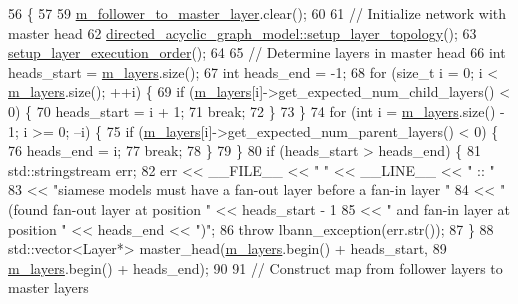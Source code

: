 \begin{DoxyCode}
56                                          \{
57 
59   \hyperlink{classlbann_1_1siamese__model_aae7af40b4a2db59082cd4c9149a1affd}{m\_follower\_to\_master\_layer}.clear();
60 
61   \textcolor{comment}{// Initialize network with master head}
62   \hyperlink{classlbann_1_1model_a7b3e2a643c658dcaa7478d2568f29784}{directed\_acyclic\_graph\_model::setup\_layer\_topology}();
63   \hyperlink{classlbann_1_1directed__acyclic__graph__model_a2a70d5719832c481db9fa962f6e5f2bd}{setup\_layer\_execution\_order}();
64 
65   \textcolor{comment}{// Determine layers in master head}
66   \textcolor{keywordtype}{int} heads\_start = \hyperlink{classlbann_1_1model_a0229fc226ec163d1411548446104569d}{m\_layers}.size();
67   \textcolor{keywordtype}{int} heads\_end = -1;
68   \textcolor{keywordflow}{for} (\textcolor{keywordtype}{size\_t} i = 0; i < \hyperlink{classlbann_1_1model_a0229fc226ec163d1411548446104569d}{m\_layers}.size(); ++i) \{
69     \textcolor{keywordflow}{if} (\hyperlink{classlbann_1_1model_a0229fc226ec163d1411548446104569d}{m\_layers}[i]->get\_expected\_num\_child\_layers() < 0) \{
70       heads\_start = i + 1;
71       \textcolor{keywordflow}{break};
72     \}
73   \}
74   \textcolor{keywordflow}{for} (\textcolor{keywordtype}{int} i = \hyperlink{classlbann_1_1model_a0229fc226ec163d1411548446104569d}{m\_layers}.size() - 1; i >= 0; --i) \{
75     \textcolor{keywordflow}{if} (\hyperlink{classlbann_1_1model_a0229fc226ec163d1411548446104569d}{m\_layers}[i]->get\_expected\_num\_parent\_layers() < 0) \{
76       heads\_end = i;
77       \textcolor{keywordflow}{break};
78     \}
79   \}
80   \textcolor{keywordflow}{if} (heads\_start > heads\_end) \{
81     std::stringstream err;
82     err << \_\_FILE\_\_ << \textcolor{stringliteral}{" "} << \_\_LINE\_\_ << \textcolor{stringliteral}{" :: "}
83         << \textcolor{stringliteral}{"siamese models must have a fan-out layer before a fan-in layer "}
84         << \textcolor{stringliteral}{"(found fan-out layer at position "} << heads\_start - 1
85         << \textcolor{stringliteral}{" and fan-in layer at position "} << heads\_end << \textcolor{stringliteral}{")"};
86     \textcolor{keywordflow}{throw} lbann\_exception(err.str());
87   \}
88   std::vector<Layer*> master\_head(\hyperlink{classlbann_1_1model_a0229fc226ec163d1411548446104569d}{m\_layers}.begin() + heads\_start,
89                                   \hyperlink{classlbann_1_1model_a0229fc226ec163d1411548446104569d}{m\_layers}.begin() + heads\_end);
90 
91   \textcolor{comment}{// Construct map from follower layers to master layers}

\end{DoxyCode}
